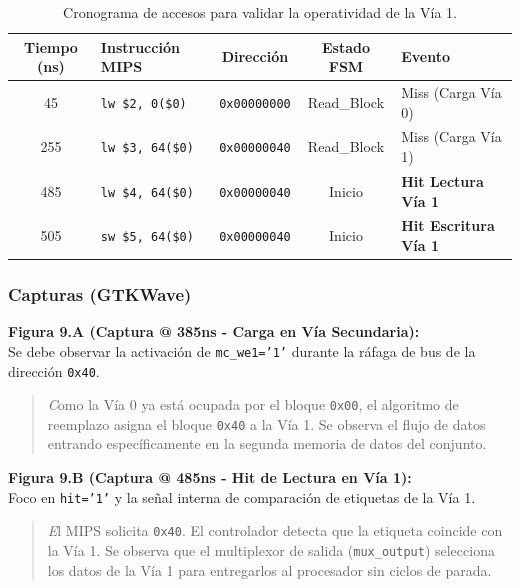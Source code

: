 \documentclass[12pt,a4paper]{article}
\begin{document}
\begin{table}[H]
\centering
\small
\renewcommand{\arraystretch}{1.2}
\begin{tabular}{|c|l|c|c|l|}
\hline
\rowcolor[HTML]{EFEFEF} 
\textbf{Tiempo (ns)} & \textbf{Instrucción MIPS} & \textbf{Dirección} & \textbf{Estado FSM} & \textbf{Evento} \\ \hline
45  & \texttt{lw \$2, 0(\$0)}    & \texttt{0x00000000} & Read\_Block        & Miss (Carga Vía 0) \\ \hline
255 & \texttt{lw \$3, 64(\$0)}   & \texttt{0x00000040} & Read\_Block        & Miss (Carga Vía 1) \\ \hline
485 & \texttt{lw \$4, 64(\$0)}   & \texttt{0x00000040} & Inicio             & \textbf{Hit Lectura Vía 1} \\ \hline
505 & \texttt{sw \$5, 64(\$0)}   & \texttt{0x00000040} & Inicio             & \textbf{Hit Escritura Vía 1} \\ \hline
\end{tabular}
\caption{Cronograma de accesos para validar la operatividad de la Vía 1.}
\end{table}

\subsubsection{Capturas (GTKWave)}

\textbf{Figura 9.A (Captura @ 385ns - Carga en Vía Secundaria):} \\
Se debe observar la activación de \texttt{mc\_we1='1'} durante la ráfaga de bus de la dirección \texttt{0x40}.
\begin{quote}
    \textit Como la Vía 0 ya está ocupada por el bloque \texttt{0x00}, el algoritmo de reemplazo asigna el bloque \texttt{0x40} a la Vía 1. Se observa el flujo de datos entrando específicamente en la segunda memoria de datos del conjunto.
\end{quote}

\textbf{Figura 9.B (Captura @ 485ns - Hit de Lectura en Vía 1):} \\
Foco en \texttt{hit='1'} y la señal interna de comparación de etiquetas de la Vía 1.
\begin{quote}
    \textit El MIPS solicita \texttt{0x40}. El controlador detecta que la etiqueta coincide con la Vía 1. Se observa que el multiplexor de salida (\texttt{mux\_output}) selecciona los datos de la Vía 1 para entregarlos al procesador sin ciclos de parada.
\end{quote}
\end{document}

